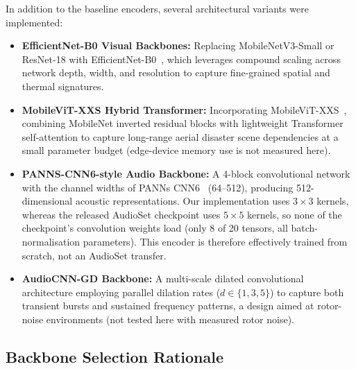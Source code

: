 In addition to the baseline encoders, several architectural variants were implemented:
\begin{itemize}
    \item \textbf{EfficientNet-B0 Visual Backbones:} Replacing MobileNetV3-Small or ResNet-18 with EfficientNet-B0~\cite{tan2019efficientnet}, which leverages compound scaling across network depth, width, and resolution to capture fine-grained spatial and thermal signatures.
    \item \textbf{MobileViT-XXS Hybrid Transformer:} Incorporating MobileViT-XXS~\cite{mehta2022mobilevit}, combining MobileNet inverted residual blocks with lightweight Transformer self-attention to capture long-range aerial disaster scene dependencies at a small parameter budget (edge-device memory use is not measured here).
    \item \textbf{PANNS-CNN6-style Audio Backbone:} A 4-block convolutional network with the channel widths of PANNs CNN6~\cite{kong2020panns} (64--512), producing 512-dimensional acoustic representations. Our implementation uses $3\times3$ kernels, whereas the released AudioSet checkpoint uses $5\times5$ kernels, so none of the checkpoint's convolution weights load (only 8 of 20 tensors, all batch-normalisation parameters). This encoder is therefore effectively trained from scratch, not an AudioSet transfer.
    \item \textbf{AudioCNN-GD Backbone:} A multi-scale dilated convolutional architecture employing parallel dilation rates ($d \in \{1, 3, 5\}$) to capture both transient bursts and sustained frequency patterns, a design aimed at rotor-noise environments (not tested here with measured rotor noise).
\end{itemize}

\subsection{Backbone Selection Rationale}
\label{sec:backbone_selection}

